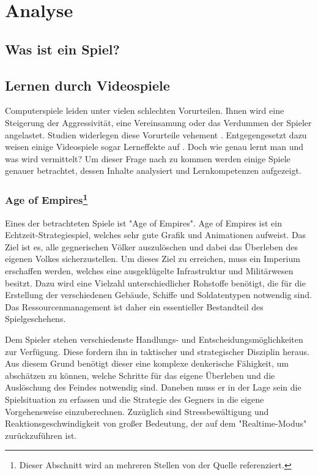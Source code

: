 \section{Analyse}
\subsection{Was ist ein Spiel?}
\subsection{Lernen durch Videospiele}
Computerspiele leiden unter vielen schlechten Vorurteilen. Ihnen wird eine Steigerung der Aggressivität, eine Vereinsamung oder das Verdummen der Spieler angelastet. Studien widerlegen diese Vorurteile vehement \cite{psylex.de2012}. Entgegengesetzt dazu weisen einige Videospiele sogar Lerneffekte auf \cite{paradisiredaktion2010}. Doch wie genau lernt man und was wird vermittelt? Um dieser Frage nach zu kommen werden einige Spiele genauer betrachtet, dessen Inhalte analysiert und Lernkompetenzen aufgezeigt. 

\subsubsection[Age of Empires]{Age of Empires\footnote{Dieser Abschnitt wird an mehreren Stellen von der Quelle \cite{bundeszentralefuerpolitischebildung2005} referenziert.}}
Eines der betrachteten Spiele ist "{}Age of Empires"{}. Age of Empires ist ein Echtzeit-Strategiespiel, welches sehr gute Grafik und Animationen aufweist. Das Ziel ist es, alle gegnerischen Völker auszulöschen und dabei das Überleben des eigenen Volkes sicherzustellen. Um dieses Ziel zu erreichen, muss ein Imperium erschaffen werden, welches eine ausgeklügelte Infrastruktur und Militärwesen besitzt. Dazu wird eine Vielzahl unterschiedlicher Rohstoffe benötigt, die für die Erstellung der verschiedenen Gebäude, Schiffe und Soldatentypen notwendig sind. Das Ressourcenmanagement ist daher ein essentieller Bestandteil des Spielgeschehens.

Dem Spieler stehen verschiedenste Handlungs- und Entscheidungsmöglichkeiten zur Verfügung. Diese fordern ihn in taktischer und strategischer Disziplin heraus. Aus diesem Grund benötigt dieser eine komplexe denkerische Fähigkeit, um abschätzen zu können, welche Schritte für das eigene Überleben und die Auslöschung des Feindes notwendig sind. Daneben muss er in der Lage sein die Spielsituation zu erfassen und die Strategie des Gegners in die eigene Vorgehensweise einzuberechnen. Zuzüglich sind Stressbewältigung und Reaktionsgeschwindigkeit von großer Bedeutung, der auf dem "{}Realtime-Modus"{} zurückzuführen ist. 

